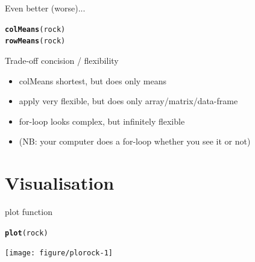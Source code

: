 \documentclass[10pt]{beamer}\usepackage[]{graphicx}\usepackage[]{color}
\makeatletter
\newcommand{\hlopt}[1]{\textcolor[rgb]{0,0,0}{#1}}%
\newcommand{\hlstd}[1]{\textcolor[rgb]{0.345,0.345,0.345}{#1}}%
\newcommand{\hlkwd}[1]{\textcolor[rgb]{0.737,0.353,0.396}{\textbf{#1}}}%
\newenvironment{kframe}{%
 \def\at@end@of@kframe{}%
 \ifinner\ifhmode%
  \def\at@end@of@kframe{\end{minipage}}%
  \begin{minipage}{\columnwidth}%
 \fi\fi%
 \def\FrameCommand##1{\hskip\@totalleftmargin \hskip-\fboxsep
 \colorbox{shadecolor}{##1}\hskip-\fboxsep
     \hskip-\linewidth \hskip-\@totalleftmargin \hskip\columnwidth}%
 \MakeFramed {\advance\hsize-\width
   \@totalleftmargin\z@ \linewidth\hsize
   \@setminipage}}%
 {\par\unskip\endMakeFramed%
 \at@end@of@kframe}
\newenvironment{knitrout}{}{} %
\makeatother
\begin{document}
\begin{frame}[fragile]{Even better (worse)...}

\begin{knitrout}
\color{fgcolor}\begin{kframe}
\begin{alltt}
  \hlkwd{colMeans}\hlstd{(rock)}
  \hlkwd{rowMeans}\hlstd{(rock)}
\end{alltt}
\end{kframe}
\end{knitrout}
  
  \pause
  
  \begin{alertblock}{Trade-off concision  / flexibility}
    \begin{itemize}
      \item colMeans shortest, but does only means
      \item apply very flexible, but does only array/matrix/data-frame
      \item for-loop looks complex, but infinitely flexible
      \item (NB: your computer does a for-loop whether you see it or not)
    \end{itemize}
  \end{alertblock}
  
\end{frame}

\section{Visualisation}

\begin{frame}[fragile]{plot function}

\begin{knitrout}
\color{fgcolor}\begin{kframe}
\begin{alltt}
\hlkwd{plot}\hlstd{(rock)}
\end{alltt}
\end{kframe}
\texttt{[image: figure/plorock-1]} 

\end{knitrout}

\end{frame}

\end{document}
